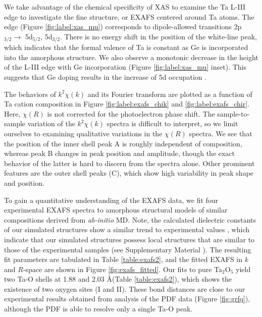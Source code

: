 We take advantage of the chemical specificity of XAS to examine the Ta L-III edge to investigate the fine structure, or EXAFS centered around Ta atoms. The edge (Figure \ref{fig:label:xas_mu}) corresponds to dipole-allowed transitions 2p$_{3/2}\rightarrow$ 5d$_{5/2}$, 5d$_{3/2}$. There is no energy shift in the position of the white-line peak, which indicates that the formal valence of Ta is constant as Ge is incorporated into the amorphous structure. We also observe a monotonic decrease in the height of the L-III edge with Ge incorporation (Figure \ref{fig:label:xas_mu} inset). This suggests that Ge doping results in the increase of 5d occupation \cite{Qi1987}.

The behaviors of $k^{2}\chi(k)$ and its Fourier transform are plotted as a function of Ta cation composition in Figure \ref{fig:label:exafs_chik} and \ref{fig:label:exafs_chir}. Here, $\chi(R)$ is not corrected for the photoelectron phase shift. The sample-to-sample variation of the $k^{2}\chi(k)$ spectra is difficult to interpret, so we limit ourselves to examining qualitative variations in the $\chi(R)$ spectra. We see that the position of the inner shell peak A is roughly independent of composition, whereas peak B changes in peak position and amplitude, though the exact behavior of the latter is hard to discern from the spectra alone. Other prominent features are the outer shell peaks (C), which show high variability in peak shape and position.

To gain a quantitative understanding of the EXAFS data, we fit four experimental EXAFS spectra to amorphous structural models of similar compositions derived from \emph{ab-initio} MD. Note, the calculated dielectric constants of our simulated structures show a similar trend to experimental values \cite{Naoi2018jap}, which indicate that our simulated structures possess local structures that are similar to those of the experimental samples (see Supplementary Material \cite{Supp}). The resulting fit parameters are tabulated in Table \ref{table:exafs2}, and the fitted EXAFS in $k$ and $R$-space are shown in Figure \ref{fig:exafs_fitted}. Our fits to pure Ta$_{2}$O$_{5}$ yield two Ta-O shells at 1.88 and 2.03 \AA \;(Table \ref{table:exafs2}), which shows the existence of two oxygen sites (I and II). These bond distances are close to our experimental results obtained from analysis of the PDF data (Figure \ref{fig:grfq}), although the PDF is able to resolve only a single Ta-O peak.

